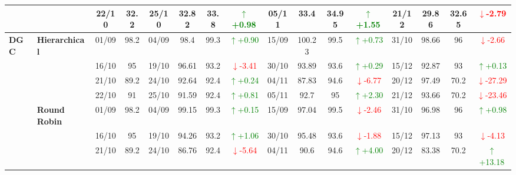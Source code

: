 {\begin{longtable}{llcc|cccc|cccc|cccc}
&
& 22/10 & 32.2 & 25/10 & 32.82 & 33.8 & \textcolor{green}{\(\uparrow\)+0.98} & 05/11 & 33.4 & 34.95 & \textcolor{green}{\(\uparrow\)+1.55} & 21/12 & 29.86 & 32.65 & \textcolor{red}{\(\downarrow\)-2.79} \\
\midrule




\multirow{12}{*}{\textbf{DGC}} 
& \textbf{Hierarchical}
& 01/09 & 98.2 & 04/09 & 98.4 & 99.3 & \textcolor{green}{\(\uparrow\)+0.90} & 15/09 & 100.23 & 99.5 & \textcolor{green}{\(\uparrow\)+0.73} & 31/10 & 98.66 & 96 & \textcolor{red}{\(\downarrow\)-2.66} \\

&
& 16/10 & 95 & 19/10 & 96.61 & 93.2 & \textcolor{red}{\(\downarrow\)-3.41} & 30/10 & 93.89 & 93.6 & \textcolor{green}{\(\uparrow\)+0.29} & 15/12 & 92.87 & 93 & \textcolor{green}{\(\uparrow\)+0.13} \\

&
& 21/10 & 89.2 & 24/10 & 92.64 & 92.4 & \textcolor{green}{\(\uparrow\)+0.24} & 04/11 & 87.83 & 94.6 & \textcolor{red}{\(\downarrow\)-6.77} & 20/12 & 97.49 & 70.2 & \textcolor{red}{\(\downarrow\)-27.29} \\

&
& 22/10 & 91 & 25/10 & 91.59 & 92.4 & \textcolor{green}{\(\uparrow\)+0.81} & 05/11 & 92.7 & 95 & \textcolor{green}{\(\uparrow\)+2.30} & 21/12 & 93.66 & 70.2 & \textcolor{red}{\(\downarrow\)-23.46} \\
\cmidrule(lr){2-16}


& \textbf{Round Robin}
& 01/09 & 98.2 & 04/09 & 99.15 & 99.3 & \textcolor{green}{\(\uparrow\)+0.15} & 15/09 & 97.04 & 99.5 & \textcolor{red}{\(\downarrow\)-2.46} & 31/10 & 96.98 & 96 & \textcolor{green}{\(\uparrow\)+0.98} \\

&
& 16/10 & 95 & 19/10 & 94.26 & 93.2 & \textcolor{green}{\(\uparrow\)+1.06} & 30/10 & 95.48 & 93.6 & \textcolor{red}{\(\downarrow\)-1.88} & 15/12 & 97.13 & 93 & \textcolor{red}{\(\downarrow\)-4.13} \\

&
& 21/10 & 89.2 & 24/10 & 86.76 & 92.4 & \textcolor{red}{\(\downarrow\)-5.64} & 04/11 & 90.6 & 94.6 & \textcolor{green}{\(\uparrow\)+4.00} & 20/12 & 83.38 & 70.2 & \textcolor{green}{\(\uparrow\)+13.18} \\


\end{longtable}}
